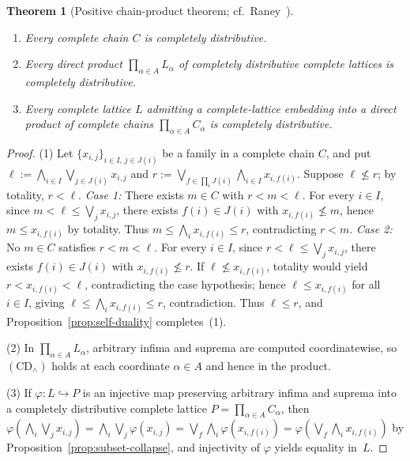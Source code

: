 \documentclass[11pt,a4paper]{article}
\theoremstyle{plain}
\newtheorem{theorem}{Theorem}[section]
\theoremstyle{definition}
\newcommand{\CDinf}{\mathrm{CD}_{\wedge}}
\begin{document}
\begin{theorem}[Positive chain-product theorem; cf.\ Raney~\cite{Raney1953}]
\label{thm:raney-pos}
\begin{enumerate}
  \item Every complete chain $C$ is completely distributive.
  \item Every direct product $\prod_{\alpha \in A} L_\alpha$ of completely distributive
    complete lattices is completely distributive.
  \item Every complete lattice $L$ admitting a complete-lattice embedding into a direct
    product of complete chains $\prod_{\alpha \in A} C_\alpha$ is completely distributive.
\end{enumerate}
\end{theorem}

\begin{proof}
(1) Let $\{x_{i,j}\}_{i \in I,\, j \in J(i)}$ be a family in a complete chain $C$, and put
$\ell := \bigwedge_{i \in I} \bigvee_{j \in J(i)} x_{i,j}$ and
$r := \bigvee_{f \in \prod_i J(i)} \bigwedge_{i \in I} x_{i, f(i)}$. Suppose $\ell \not\le r$;
by totality, $r < \ell$.
\emph{Case 1:} There exists $m \in C$ with $r < m < \ell$. For every $i \in I$, since
$m < \ell \le \bigvee_j x_{i,j}$, there exists $f(i) \in J(i)$ with $x_{i, f(i)} \not\le m$,
hence $m \le x_{i, f(i)}$ by totality. Thus $m \le \bigwedge_i x_{i, f(i)} \le r$,
contradicting $r < m$.
\emph{Case 2:} No $m \in C$ satisfies $r < m < \ell$. For every $i \in I$, since
$r < \ell \le \bigvee_j x_{i,j}$, there exists $f(i) \in J(i)$ with $x_{i, f(i)} \not\le r$.
If $\ell \not\le x_{i, f(i)}$, totality would yield $r < x_{i, f(i)} < \ell$, contradicting
the case hypothesis; hence $\ell \le x_{i, f(i)}$ for all $i \in I$, giving
$\ell \le \bigwedge_i x_{i, f(i)} \le r$, contradiction. Thus $\ell \le r$, and
Proposition~\ref{prop:self-duality} completes~(1).

(2) In $\prod_{\alpha \in A} L_\alpha$, arbitrary infima and suprema are computed
coordinatewise, so $(\CDinf)$ holds at each coordinate $\alpha \in A$ and hence in the
product.

(3) If $\varphi : L \hookrightarrow P$ is an injective map preserving arbitrary infima
and suprema into a completely distributive complete lattice $P = \prod_{\alpha \in A} C_\alpha$,
then $\varphi(\bigwedge_i \bigvee_j x_{i,j}) = \bigwedge_i \bigvee_j \varphi(x_{i,j})
= \bigvee_f \bigwedge_i \varphi(x_{i, f(i)}) = \varphi(\bigvee_f \bigwedge_i x_{i, f(i)})$
by Proposition~\ref{prop:subset-collapse}, and injectivity of $\varphi$ yields equality in~$L$.
\end{proof}
\end{document}
